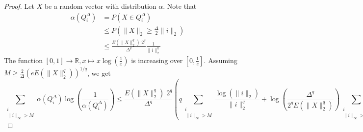 \documentclass[12pt]{report}
\theoremstyle{definition}
\theoremstyle{remark}
\begin{document}
\begin{proof}
	Let $X$ be a random vector with distribution $\alpha$. Note that 
$$\begin{aligned}
\alpha(Q_i^\Delta) &= P(X\in Q_i^\Delta)\\ &\leq P(\|X\|_2\geq \frac{\Delta}{2} \|i\|_2)\\
&\leq \frac{E(\|X\|_2^q)\; 2^q}{\Delta^q}\frac{1}{\|i\|_2^q}
\end{aligned}
$$
The function $[0,1]\to \mathbb R, x\mapsto x\log\left(\frac{1}{x}\right)$ is increasing over $[0,\frac 1e]$. Assuming $\displaystyle M\geq \frac{2}{\Delta}\left(eE(\|X\|_2^q) \right)^{1/q}$, we get 
\begin{equation}
\sum_{\substack{i\\ \|i\|_\infty > M}} \alpha(Q_i^\Delta)\log\left(\frac{1}{\alpha(Q_i^\Delta)}\right)
\leq\frac{E(\|X\|_2^q)\; 2^q}{\Delta^q}\left(q \sum_{\substack{i\\ \|i\|_\infty > M}} \frac{\log(\|i\|_2)}{\|i\|_2^q} + \log\left(\frac{\Delta^q}{2^qE(\|X\|_2^q)} \right)\sum_{\substack{i\\ \|i\|_\infty > M}} \frac{1}{\|i\|_2^q} \right) \tag{5} \label{5}
\end{equation}


\end{proof}
\end{document}
